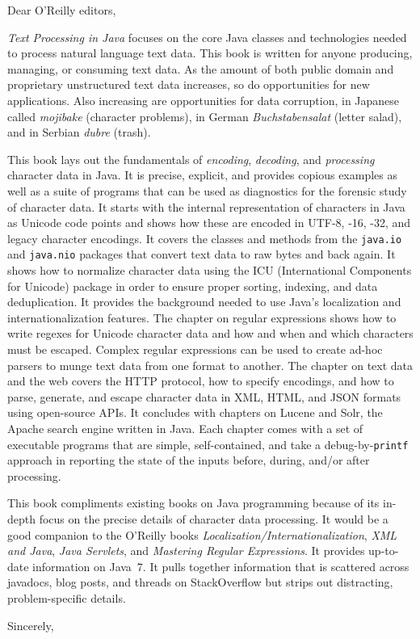 \documentclass{letter}
\begin{document}
\begin{letter}{}
\opening{Dear O'Reilly editors,}

\emph{Text Processing in Java} focuses on the core Java classes and
technologies needed to process natural language text data.
This book is written for anyone producing, managing, or consuming text data.
As the amount of both public domain and proprietary unstructured text data
increases, so do opportunities for new applications.
Also increasing are opportunities for data corruption, in Japanese called \emph{mojibake}
(character problems),
in German \emph{Buchstabensalat} (letter salad),
and in Serbian \emph{dubre} (trash).

This book lays out the fundamentals of \emph{encoding}, \emph{decoding},
and \emph{processing} character data in Java.
It is precise, explicit, and provides copious examples
as well as a suite of programs that can be used 
as diagnostics for the forensic study of character data.
It starts with the internal representation of characters in Java as Unicode code points
and shows how these are encoded in UTF-8, -16, -32, and legacy character encodings.
It covers the classes and methods from the \texttt{java.io} and \texttt{java.nio} packages
that convert text data to raw bytes and back again.
It shows how to normalize character data using the ICU 
(International Components for Unicode) package
in order to ensure proper sorting, indexing, and data deduplication.
It provides the background needed to use Java's
localization and internationalization features.
The chapter on regular expressions shows how to
write regexes for Unicode character data and how
and when and which characters must be escaped.
Complex regular expressions can be used to create
ad-hoc parsers to munge text data from one format to another.
The chapter on text data and the web covers the HTTP protocol,
how to specify encodings, and how to parse, generate, and escape
character data in XML, HTML, and JSON formats using open-source APIs.
It concludes with chapters on Lucene and Solr,
the Apache search engine written in Java.
Each chapter comes with a set of executable programs
that are simple, self-contained, and take a
debug-by-\texttt{printf} approach in reporting the state of the inputs
before, during, and/or after processing.

This book compliments existing books on Java programming because
of its in-depth focus on the precise details of character data processing.
It would be a good companion to the O'Reilly books
\emph{Localization/Internationalization}, 
\emph{XML and Java},
\emph{Java Servlets},
and \emph{Mastering Regular Expressions}.
It provides up-to-date information on Java~7.
It pulls together information that is scattered across javadocs, blog posts, and threads on 
StackOverflow but strips out distracting, problem-specific details. 

\closing{Sincerely,}
\end{letter}
\end{document}
